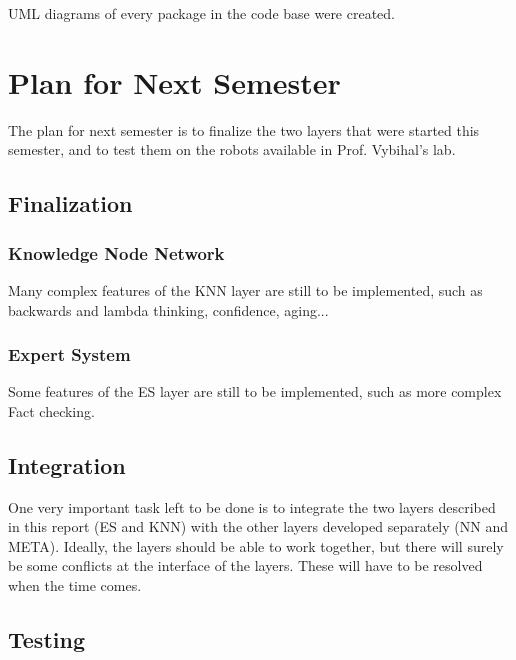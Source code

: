 \documentclass[titlepage,11pt]{article}
\begin{document}
UML diagrams of every package in the code base were created.

\section{Plan for Next Semester}

The plan for next semester is to finalize the two layers that were started this semester, and to test them on the robots available in Prof. Vybihal's lab.

\subsection{Finalization}

\subsubsection{Knowledge Node Network}

Many complex features of the KNN layer are still to be implemented, such as backwards and lambda thinking, confidence, aging...

\subsubsection{Expert System}

Some features of the ES layer are still to be implemented, such as more complex Fact checking.

\subsection{Integration}

One very important task left to be done is to integrate the two layers described in this report (ES and KNN) with the other layers developed separately (NN and META). Ideally, the layers should be able to work together, but there will surely be some conflicts at the interface of the layers. These will have to be resolved when the time comes.

\subsection{Testing}
\end{document}
